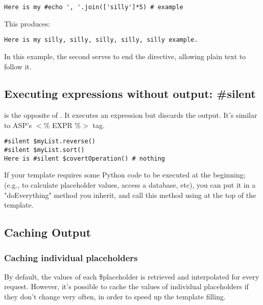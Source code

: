 \begin{verbatim}
Here is my #echo ', '.join(['silly']*5) # example 
\end{verbatim}

This produces:

\begin{verbatim}
Here is my silly, silly, silly, silly, silly example.
\end{verbatim}

In this example, the second \code{\#} serves to end the  directive,
allowing plain text to follow it.

\subsection{Executing expressions without output: \#silent}
\label{output.silent}

 is the opposite of .  It executes an expression
but discards the output.  It's similar to ASP's $<$\% EXPR \%$>$ tag.

\begin{verbatim}
#silent $myList.reverse()
#silent $myList.sort()
Here is #silent $covertOperation() # nothing
\end{verbatim}

If your template requires some Python code to be executed at the beginning;
(e.g., to calculate placeholder values, access a database, etc), you can put
it in a "doEverything" method you inherit, and call this method using
 at the top of the template.

\subsection{Caching Output}
\label{output.caching}

\subsubsection{Caching individual placeholders}
\label{output.caching.placeholders}

By default, the values of each \$placeholder is retrieved and
interpolated for every request. However, it's possible to cache the values
of individual placeholders if they don't change very often, in order to 
speed up the template filling.
                         
